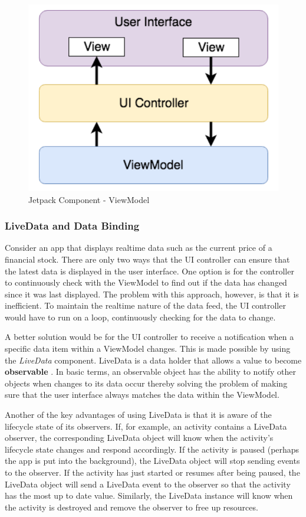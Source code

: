 \begin{figure}
    \centering
    \includegraphics[scale=0.5]{screenshots/viewmodel.png}
    \caption{Jetpack Component - ViewModel}
    \label{fig:viewmodel}
\end{figure}

\subsubsection{LiveData and Data Binding}
Consider an app that displays realtime data such as the current price of a financial stock. There are only two ways that the UI controller can ensure that the latest data is displayed in the user interface. One option is for the controller to continuously check with the ViewModel to find out if the data has 
changed since it was last displayed. The problem with this approach, however, is that it is inefficient. To maintain the realtime nature of the data feed, the UI controller would have to run on a loop, continuously checking for the data to change.

A better solution would be for the UI controller to receive a notification when a specific data item within a ViewModel changes. This is made possible by using the \textit{LiveData} component. LiveData is a data holder that allows a value to become \textbf{observable} . In basic terms, an observable object has the ability to notify other objects when changes to its data occur thereby solving the problem of making sure that the user interface always matches the data within the ViewModel.

Another of the key advantages of using LiveData is that it is aware of the lifecycle state of its observers. If, for example, an activity contains a LiveData observer, the corresponding LiveData object will know when the activity’s lifecycle state changes and respond accordingly. If the activity is paused (perhaps the app is put into the background), the LiveData object will stop sending events to the observer. If the activity has just started or resumes after being paused, the LiveData object will send a LiveData event to the observer so that the activity has the most up to date value. Similarly, the LiveData instance will know when the activity is destroyed and remove the observer to free up resources.

